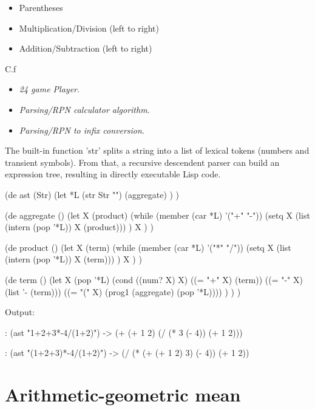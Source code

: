 \begin{itemize}
\item
  Parentheses
\item
  Multiplication/Division (left to right)
\item
  Addition/Subtraction (left to right)
\end{itemize}

\begin{description}
\item[C.f]
\end{description}

\begin{itemize}
\item
  \emph{24 game Player}.
\item
  \emph{Parsing/RPN calculator algorithm}.
\item
  \emph{Parsing/RPN to infix conversion}.
\end{itemize}


\begin{wideverbatim}

The built-in function 'str' splits a string into a list of lexical tokens
(numbers and transient symbols). From that, a recursive descendent parser can
build an expression tree, resulting in directly executable Lisp code.

(de ast (Str)
   (let *L (str Str "")
      (aggregate) ) )

(de aggregate ()
   (let X (product)
      (while (member (car *L) '("+" "-"))
         (setq X (list (intern (pop '*L)) X (product))) )
      X ) )

(de product ()
   (let X (term)
      (while (member (car *L) '("*" "/"))
         (setq X (list (intern (pop '*L)) X (term))) )
      X ) )

(de term ()
   (let X (pop '*L)
      (cond
         ((num? X) X)
         ((= "+" X) (term))
         ((= "-" X) (list '- (term)))
         ((= "(" X) (prog1 (aggregate) (pop '*L)))) ) ) )

Output:

: (ast "1+2+3*-4/(1+2)")
-> (+ (+ 1 2) (/ (* 3 (- 4)) (+ 1 2)))

: (ast "(1+2+3)*-4/(1+2)")
-> (/ (* (+ (+ 1 2) 3) (- 4)) (+ 1 2))

\end{wideverbatim}

\pagebreak{}
\section*{Arithmetic-geometric mean}

